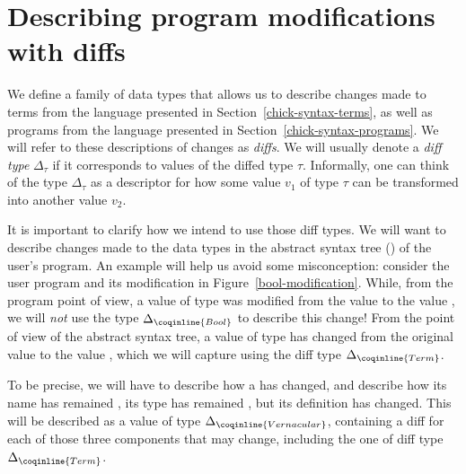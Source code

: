 \section{Describing program modifications with diffs}\label{chick-diffs}

We define a family of data types that allows us to describe changes made to
terms from the language presented in Section~\ref{chick-syntax-terms}, as well
as programs from the language presented in Section~\ref{chick-syntax-programs}.
We will refer to these descriptions of changes as \textit{diffs}.  We will
usually denote a \textit{diff type} $\Delta_{\tau}$ if it corresponds to values
of the diffed type $\tau$.  Informally, one can think of the type
$\Delta_{\tau}$ as a descriptor for how some value $v_{1}$ of type $\tau$ can be
transformed into another value $v_{2}$.

It is important to clarify how we intend to use those diff types.  We will want
to describe changes made to the data types in the abstract syntax tree
() of the user's program.  An example will help us avoid some
misconception: consider the user program and its modification in
Figure~\ref{bool-modification}.  While, from the program point of view, a value
of type  was modified from the value  to the
value , we will \emph{not} use the type
$\Delta_{\coqinline{Bool}}$ to describe this change!  From the point of view of
the abstract syntax tree, a value of type  has changed from the
original value  to the value ,
which we will capture using the diff type $\Delta_{\coqinline{Term}}$.

To be precise, we will have to describe how a  has
changed, and describe how its name has remained , its type has
remained , but its definition has changed.  This will be
described as a value of type $\Delta_{\coqinline{Vernacular}}$, containing a
diff for each of those three components that may change, including the one of
diff type $\Delta_{\coqinline{Term}}$.

